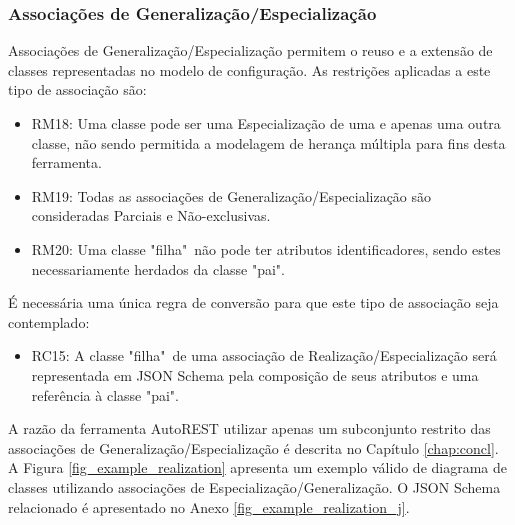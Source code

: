 
\subsubsection{Associações de Generalização/Especialização}

Associações de Generalização/Especialização permitem o reuso e a extensão de classes representadas no modelo de configuração. As restrições aplicadas a este tipo de associação são:

\begin{itemize}
    \item RM18: Uma classe pode ser uma Especialização de uma e apenas uma outra classe, não sendo permitida a modelagem de herança múltipla para fins desta ferramenta.

    \item RM19: Todas as associações de Generalização/Especialização são consideradas Parciais e Não-exclusivas.

    \item RM20: Uma classe "filha"\ não pode ter atributos identificadores, sendo estes necessariamente herdados da classe "pai".
\end{itemize}

É necessária uma única regra de conversão para que este tipo de associação seja contemplado:

\begin{itemize}
    \item RC15: A classe "filha"\ de uma associação de Realização/Especialização será representada em JSON Schema pela composição de seus atributos e uma referência à classe "pai".
\end{itemize}

A razão da ferramenta AutoREST utilizar apenas um subconjunto restrito das associações de Generalização/Especialização é descrita no Capítulo \ref{chap:concl}. A Figura \ref{fig_example_realization} apresenta um exemplo válido de diagrama de classes utilizando associações de Especialização/Generalização. O JSON Schema relacionado é apresentado no Anexo \ref{fig_example_realization_j}.

